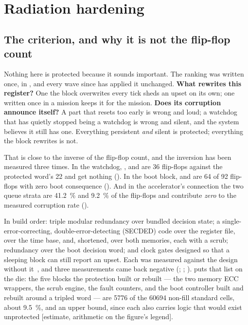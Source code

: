 
\chapter{Radiation hardening}
\label{ch:harden}

\section{The criterion, and why it is not the flip-flop count}
\label{sec:harden-criterion}

Nothing here is protected because it sounds important. The ranking was
written once, in , and every wave since has
applied it unchanged. \textbf{What rewrites this register?} One the
block overwrites every tick sheds an upset on its own; one written once
in a mission keeps it for the mission. \textbf{Does its corruption
announce itself?} A part that resets too early is wrong and loud; a
watchdog that has quietly stopped being a watchdog is wrong and silent,
and the system believes it still has one. Everything persistent
\emph{and} silent is protected; everything the block rewrites is not.

That is close to the inverse of the flip-flop count, and the inversion
has been measured three times. In the watchdog, ,
 and  are 36 flip-flops against the protected
word's 22 and get nothing (). In the boot block,
 and  are 64 of 92 flip-flops with zero boot
consequence (). And in the accelerator's connection the
two queue strata are \SI{41.2}{\percent} and \SI{9.2}{\percent} of the
flip-flops and contribute \emph{zero} to the measured corruption rate
().

In build order: triple modular redundancy over bundled decision state;
a single-error-correcting, double-error-detecting (SECDED) code over the
register file, over the time base, and, shortened, over both memories,
each with a scrub; redundancy over the boot decision word; and clock
gates designed so that a sleeping block can still report an upset. Each
was measured against the design without it~\cite{clear2018}, and three
measurements came back negative (; ;
).  puts that list on the
die: the five blocks the protection built or rebuilt --- the two memory
ECC wrappers, the scrub engine, the fault counters, and the boot
controller  built and  rebuilt around a tripled word
--- are \num{5776} of the \num{60694} non-fill standard cells, about
\SI{9.5}{\percent}, and an upper bound, since each also carries logic
that would exist unprotected [estimate, arithmetic on the figure's
legend].

